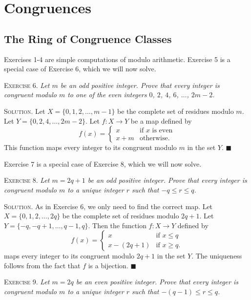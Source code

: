 \documentclass[11pt, leqno]{article}
\newcommand{\done}{\ensuremath{\blacksquare}}
\begin{document}
\section{Congruences}

\subsection{The Ring of Congruence Classes}

Exercises 1-4 are simple computations of modulo arithmetic. Exercise 5 is a special case of Exercise 6, which we will now solve.

\textsc{Exercise 6}. \emph{Let $m$ be an odd positive integer. Prove that every integer is congruent modulo $m$ to one of the even integers $0$, $2$, $4$, $6$, $\ldots$, $2m-2$.}

\textsc{Solution}. Let $X=\{0,1,2,\ldots,m-1\}$ be the complete set of residues modulo $m$. Let $Y=\{0,2,4,\ldots,2m-2\}$. Let $f: X \to Y$ be a map defined by 
\begin{displaymath}
  f(x) = \begin{cases}
    x & \text{if } x \text{ is even} \\
    x+m & \text{otherwise.}
  \end{cases}
\end{displaymath}
This function maps every integer to its congruent modulo $m$ in the set $Y$. \done

Exercise 7 is a special case of Exercise 8, which we will now solve.

\textsc{Exercise 8}. \emph{Let $m = 2q + 1$ be an odd positive integer. Prove that every integer is congruent modulo $m$ to a unique integer $r$ such that $-q \leq r \leq q$.}

\textsc{Solution}. As in Exercise 6, we only need to find the correct map. Let $X=\{0,1,2,\ldots, 2q\}$ be the complete set of residues modulo $2q+1$. Let $Y = \{-q,-q+1,\ldots,q-1,q\}$. Then the function $f:X\to Y$ defined by 
\begin{displaymath}
f(x) =
\begin{cases}
  x & \text{if } x\leq q \\
  x-(2q+1) & \text{if } x\geq q.
\end{cases}
\end{displaymath}
maps every integer to its congruent modulo $2q+1$ in the set $Y$. The uniqueness follows from the fact that $f$ is a bijection. \done

\textsc{Exercise 9}. \emph{Let $m=2q$ be an even positive integer. Prove that every integer is congruent modulo $m$ to a unique integer $r$ such that $-(q-1) \leq r \leq q$.}
\end{document}
